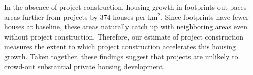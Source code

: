 \documentclass[12pt]{article}
\begin{document}
In the absence of project construction, housing growth in footprints out-paces areas further from projects by 374 houses per $\text{km}^{2}$.  Since footprints have fewer houses at baseline, these areas naturally catch up with neighboring areas even without project construction.  Therefore, our estimate of project construction measures the extent to which project construction accelerates this housing growth.  Taken together, these findings suggest that projects are unlikely to crowd-out substantial private housing development.  






\end{document}
